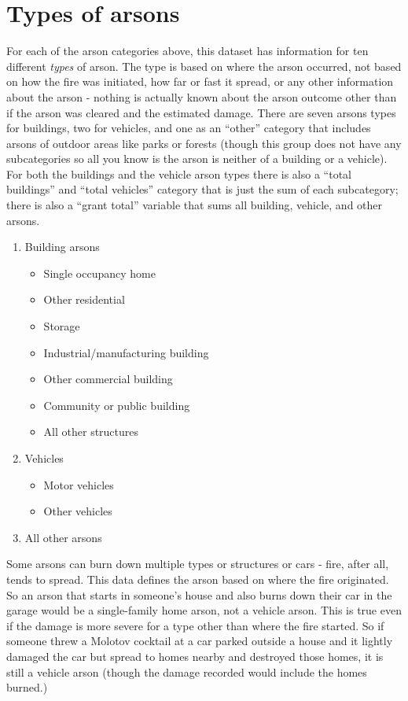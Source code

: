 \documentclass[
  12pt,
  openany]{book}
\providecommand{\tightlist}{%
  \setlength{\itemsep}{0pt}\setlength{\parskip}{0pt}}
\begin{document}
\hypertarget{arsonType}{%
\section{Types of arsons}\label{arsonType}}

For each of the arson categories above, this dataset has information for ten different \emph{types} of arson. The type is based on where the arson occurred, not based on how the fire was initiated, how far or fast it spread, or any other information about the arson - nothing is actually known about the arson outcome other than if the arson was cleared and the estimated damage. There are seven arsons types for buildings, two for vehicles, and one as an ``other'' category that includes arsons of outdoor areas like parks or forests (though this group does not have any subcategories so all you know is the arson is neither of a building or a vehicle). For both the buildings and the vehicle arson types there is also a ``total buildings'' and ``total vehicles'' category that is just the sum of each subcategory; there is also a ``grant total'' variable that sums all building, vehicle, and other arsons.

\begin{enumerate}
\def\labelenumi{\arabic{enumi}.}
\tightlist
\item
  Building arsons

  \begin{itemize}
  \tightlist
  \item
    Single occupancy home
  \item
    Other residential
  \item
    Storage
  \item
    Industrial/manufacturing building
  \item
    Other commercial building
  \item
    Community or public building
  \item
    All other structures
  \end{itemize}
\item
  Vehicles

  \begin{itemize}
  \tightlist
  \item
    Motor vehicles
  \item
    Other vehicles
  \end{itemize}
\item
  All other arsons
\end{enumerate}

Some arsons can burn down multiple types or structures or cars - fire, after all, tends to spread. This data defines the arson based on where the fire originated. So an arson that starts in someone's house and also burns down their car in the garage would be a single-family home arson, not a vehicle arson. This is true even if the damage is more severe for a type other than where the fire started. So if someone threw a Molotov cocktail at a car parked outside a house and it lightly damaged the car but spread to homes nearby and destroyed those homes, it is still a vehicle arson (though the damage recorded would include the homes burned.)
\end{document}

